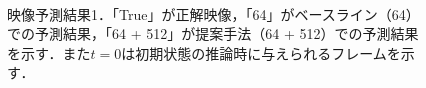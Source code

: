 \begin{figure}[tp]
    \centering
    \\
    \caption[映像予測結果1]{映像予測結果1．「True」が正解映像，「64」がベースライン（64）での予測結果，「64 + 512」が提案手法（64 + 512）での予測結果を示す．また$t = 0$は初期状態の推論時に与えられるフレームを示す．}
    \label{fig:compare_ab}
\end{figure}

